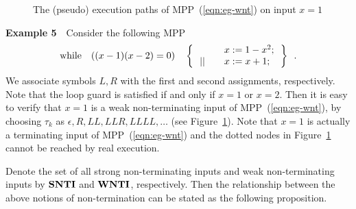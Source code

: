\documentclass{article}
\newcommand{\while}{{\rm while}}
\newcommand{\SNTI}{{\bf SNTI}}
\newcommand{\WNTI}{{\bf WNTI}}
\begin{document}
\begin{figure}
\begin{minipage}[t]{0.45\linewidth}

\caption{\small The (pseudo) execution paths of MPP~(\ref{eqn:eg-wnt}) on input $x=1$}\label{fig:eg-wnt}
\end{minipage}
\end{figure}

{\bf Example 5}~~{Consider the following MPP
\begin{equation}\label{eqn:eg-wnt}
\while \quad ((x-1)(x-2)=0) \quad \left\{
\begin{array}{ll}
& \quad x := 1-x^2; \\
\,|| & \quad x := x+1; \\
\end{array}
\,\right\} \enspace .
\end{equation}
We associate symbols $L,R$ with the first and second assignments, respectively. Note that the loop guard is satisfied if and only if $x=1$ or $x=2$. Then it is easy to verify that $x=1$ is a weak non-terminating input of MPP~(\ref{eqn:eg-wnt}), by choosing $\tau_k$ as $\epsilon, R, LL, LLR, LLLL, \ldots$ (see Figure~\ref{fig:eg-wnt}).
Note that $x=1$ is actually a terminating input of MPP~(\ref{eqn:eg-wnt}) and the dotted nodes in Figure~\ref{fig:eg-wnt} cannot be reached by real execution. }

Denote the set of all strong non-terminating inputs and weak non-terminating inputs by $\SNTI$ and $\WNTI$, respectively. Then the relationship between the above notions of non-termination can be stated as the following proposition.
\end{document}
